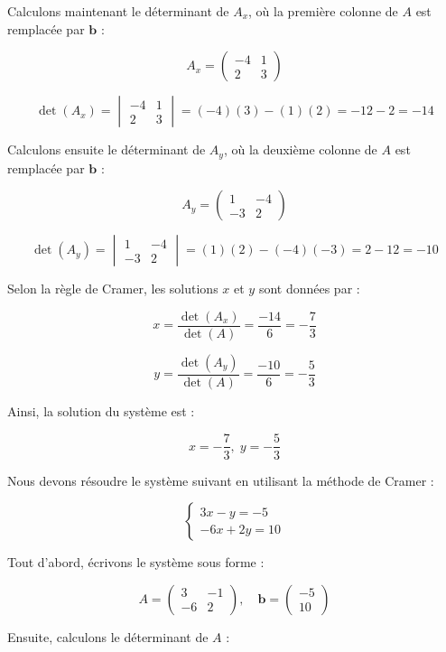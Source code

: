 \documentclass[12pt]{article}
\begin{document}
Calculons maintenant le déterminant de $A_x$, où la première colonne de $A$ est remplacée par $\mathbf{b}$ :

\[
A_x = \begin{pmatrix}
-4 & 1 \\
2 & 3
\end{pmatrix}
\]

\[
\det(A_x) = \begin{vmatrix}
-4 & 1 \\
2 & 3
\end{vmatrix} = (-4)(3) - (1)(2) = -12 - 2 = -14
\]

Calculons ensuite le déterminant de $A_y$, où la deuxième colonne de $A$ est remplacée par $\mathbf{b}$ :

\[
A_y = \begin{pmatrix}
1 & -4 \\
-3 & 2
\end{pmatrix}
\]

\[
\det(A_y) = \begin{vmatrix}
1 & -4 \\
-3 & 2
\end{vmatrix} = (1)(2) - (-4)(-3) = 2 - 12 = -10
\]

Selon la règle de Cramer, les solutions $x$ et $y$ sont données par :

\[
x = \frac{\det(A_x)}{\det(A)} = \frac{-14}{6} = -\frac{7}{3}
\]

\[
y = \frac{\det(A_y)}{\det(A)} = \frac{-10}{6} = -\frac{5}{3}
\]

Ainsi, la solution du système est :

\[
\boxed{x = -\frac{7}{3}, \; y = -\frac{5}{3}}
\]

Nous devons résoudre le système suivant en utilisant la méthode de Cramer :

\[
\begin{cases}
3x - y = -5 \\
-6x + 2y = 10
\end{cases}
\]

Tout d'abord, écrivons le système sous forme :

\[
A = \begin{pmatrix}
3 & -1 \\
-6 & 2
\end{pmatrix}, \quad
\mathbf{b} = \begin{pmatrix}
-5 \\
10
\end{pmatrix}
\]

Ensuite, calculons le déterminant de $A$ :
\end{document}
